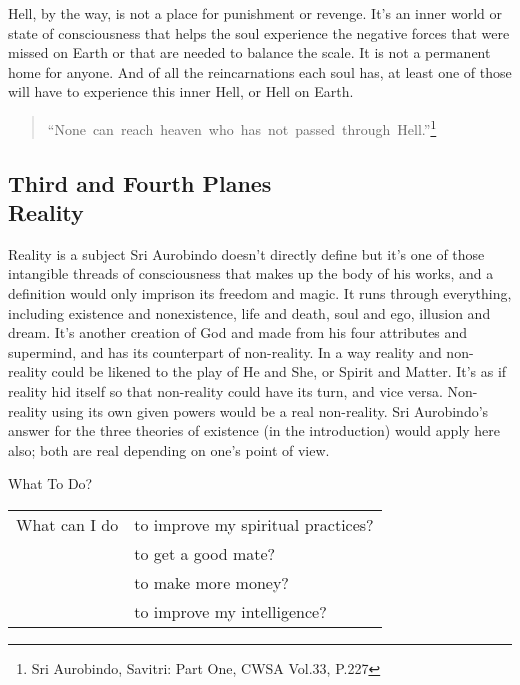 \documentclass[12pt,a4paper]{book}
\begin{document}
Hell, by the way, is not a place for punishment or revenge. It's an
inner world or state of consciousness that helps the soul experience
the negative forces that were missed on Earth or that are needed to
balance the scale. It is not a permanent home for anyone. And of all
the reincarnations each soul has, at least one of those will have to
experience this inner Hell, or Hell on Earth.

\begin{verse}
\hspace{-1.1cm}
``None~can~reach~heaven~who~has~not~passed~through~Hell.''\footnote{Sri Aurobindo, Savitri: Part One, CWSA Vol.33, P.227}
\end{verse}


\newpage
\begin{center}\section*{Third and Fourth Planes\\Reality}\end{center}

Reality is a subject Sri Aurobindo doesn't directly define but it's
one of those intangible threads of consciousness that makes up the
body of his works, and a definition would only imprison its freedom
and magic. It runs through everything, including existence and
nonexistence, life and death, soul and ego, illusion and dream. It's
another creation of God and made from his four attributes and
supermind, and has its counterpart of non-reality. In a way reality and
non-reality could be likened to the play of He and She, or Spirit and
Matter. It's as if reality hid itself so that non-reality could have
its turn, and vice versa. Non-reality using its own given powers would
be a real non-reality. Sri Aurobindo's answer for the three theories of
existence (in the introduction) would apply here also; both are real
depending on one's point of view.

\noindent What To Do?

\noindent \hspace{-2mm}\begin{tabular}{ll}
What can I do &to improve my spiritual practices?\\
\ 	      &to get a good mate?\\
\             &to make more money?\\
\             &to improve my intelligence?\\
\end{tabular}
\end{document}
